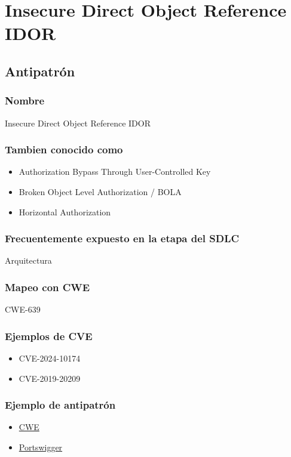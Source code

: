 \chapter{Insecure Direct Object Reference IDOR}
\section{Antipatrón}
\subsection{Nombre}
Insecure Direct Object Reference IDOR
\subsection{Tambien conocido como}
\begin{itemize}
    \item Authorization Bypass Through User-Controlled Key
    \item Broken Object Level Authorization / BOLA
    \item Horizontal Authorization
\end{itemize}
\subsection{Frecuentemente expuesto en la etapa del SDLC}
Arquitectura
\subsection{Mapeo con CWE}
CWE-639
\subsection{Ejemplos de CVE}
\begin{itemize}
    \item CVE-2024-10174
    \item CVE-2019-20209
\end{itemize}
\subsection{Ejemplo de antipatrón}
\begin{itemize}
    \item \href{https://cwe.mitre.org/data/definitions/639.html}{CWE}
    \item \href{https://portswigger.net/web-security/access-control/idor}{Portswigger}
\end{itemize}
